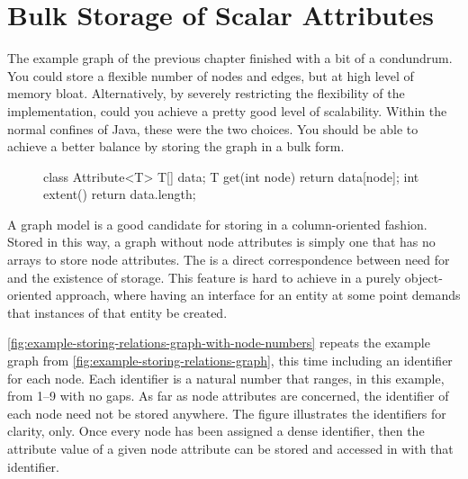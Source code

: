 \section{Bulk Storage of Scalar Attributes}
 
The example graph of the previous chapter finished with a bit of a condundrum.
You could store a flexible number of nodes and edges, but at high level of
memory bloat. Alternatively, by severely restricting the flexibility of the
implementation, could you achieve a pretty good level of scalability. Within the
normal confines of Java, these were the two choices. You should be able to
achieve a better balance by storing the graph in a bulk form.

\begin{figure}
\vspace{-2mm}
\begin{framedlisting}
class Attribute<T> {
  T[] data;
  T get(int node) {
     return data[node];
  }
  int extent() {
    return data.length;
  }
}
\end{framedlisting}
\end{figure}
A graph model is a good candidate for storing in a column-oriented fashion.
Stored in this way, a graph without node attributes is simply one that has no
arrays to store node attributes. The is a direct correspondence between need for
and the existence of storage. This feature is hard to achieve in a purely
object-oriented approach, where having an interface for an entity at some point
demands that instances of that entity be created.

\autoref{fig:example-storing-relations-graph-with-node-numbers} repeats the
example graph from \autoref{fig:example-storing-relations-graph}, this time
including an identifier for each node. Each identifier is a natural number that
ranges, in this example, from 1--9 with no gaps. As far as node attributes are
concerned, the identifier of each node need not be stored anywhere. The figure
illustrates the identifiers for clarity, only. Once every node has been assigned
a dense identifier, then the attribute value of a given node attribute can be
stored and accessed in with that identifier.

